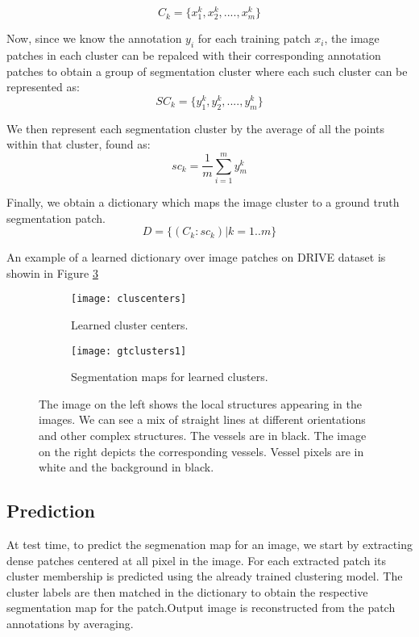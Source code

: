 $$
C_k = \{x^k_1,x^k_2,....,x^k_m\}
$$

Now, since we know the annotation $y_i$ for each training patch $x_i$, the image patches in each cluster can be repalced with their corresponding annotation patches to obtain a group of segmentation cluster where each such cluster can be represented as:
$$
SC_k = \{y^k_1,y^k_2,....,y^k_m\}
$$

We then represent each segmentation cluster by the average of all the points within that cluster, found as:
$$	
sc_k = \frac{1}{m}\sum\limits_{i=1}^{m} y^k_m
$$

Finally, we obtain a dictionary which maps the image cluster to a ground truth segmentation patch.
$$
D = \{ (C_k : sc_k) | k =1..m\}
$$

An example of a learned dictionary over image patches on DRIVE dataset is showin in Figure \ref{fig:cb-cls}
\begin{figure}
	\begin{subfigure}[b]{0.45\textwidth}
		\texttt{[image: cluscenters]}
		\caption{Learned cluster centers.}
		\label{fig:cluscenters}
	\end{subfigure}
	\begin{subfigure}[b]{0.45\textwidth}
		\texttt{[image: gtclusters1]}
		\caption{Segmentation maps for learned clusters.}
		\label{fig:gtclusters}
	\end{subfigure}
	\caption[Local structures learned using clustering and their segmenations maps]{The image on the left shows the local structures appearing in the images. We can see a mix of straight lines at different orientations and other complex structures. The vessels are in black. The image on the right depicts the corresponding vessels. Vessel pixels are in white and the background in black.}
	\label{fig:cb-cls}
\end{figure}

\subsection{Prediction}
At test time, to predict the segmenation map for an image, we start by extracting dense patches centered at all pixel in the image. For each extracted patch its cluster membership is predicted using the already trained clustering model. The cluster labels are then matched in the dictionary to obtain the respective segmentation map for the patch.Output image is reconstructed from the patch annotations by averaging. 

